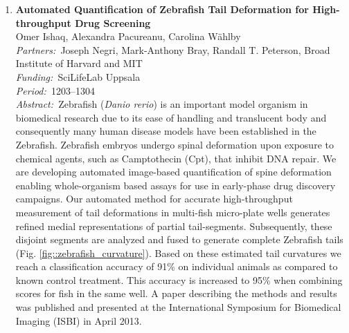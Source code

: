 \documentclass[10pt, a4paper]{article}
\newcommand{\aabstract}[1]{\emph{Abstract:~}#1}
\newcommand{\ffunding}[1]{\emph{Funding:~}#1\\}
\newcommand{\ppartners}[1]{\emph{Partners:~}#1\\}
\newcommand{\pperiod}[1]{\emph{Period:~}#1\\}
\begin{document}
\begin{enumerate}
\item 
\textbf{Automated Quantification of Zebrafish Tail Deformation for High-throughput Drug Screening}\\
Omer Ishaq, Alexandra Pacureanu, Carolina W\"{a}hlby\\
\ppartners{Joseph Negri, Mark-Anthony Bray, Randall T. Peterson, Broad Institute of Harvard and MIT}
\ffunding{SciLifeLab Uppsala}
\pperiod{1203--1304}
\aabstract{Zebrafish (\emph{Danio rerio}) is an important model organism in biomedical research due to its ease of handling and translucent body and consequently many human disease models have been established in the Zebrafish. Zebrafish embryos undergo spinal deformation upon exposure to chemical agents, such as Camptothecin (Cpt), that inhibit DNA repair. We are developing automated image-based quantification of spine deformation enabling whole-organism based assays for use in early-phase drug discovery campaigns. Our automated method for accurate high-throughput measurement of tail deformations in multi-fish micro-plate wells generates refined medial representations of partial tail-segments. Subsequently, these disjoint segments are analyzed and fused to generate complete Zebrafish tails (Fig. \ref{fig::zebrafish_curvature}). Based on these estimated tail curvatures we reach a classification accuracy of 91\% on individual animals as compared to known control treatment. This accuracy is increased to 95\% when combining scores for fish in the same well. A paper describing the methods and results was published and presented at the International Symposium for Biomedical Imaging (ISBI) in April 2013.}

\begin{figure}[!htbp]
\centering
{}


\end{figure}
\end{enumerate}
\end{document}
